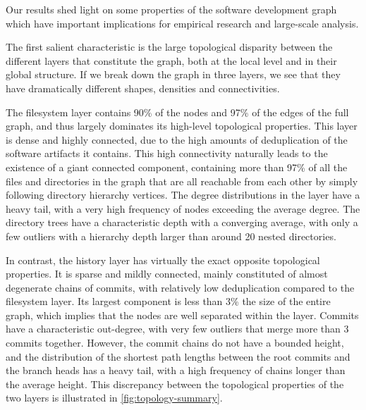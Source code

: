 Our results shed light on some properties of the software development graph
which have important implications for empirical research and large-scale
analysis.

The first salient characteristic is the large topological disparity between the
different layers that constitute the graph, both at the local level and in
their global structure. If we break down the graph in three layers, we see that
they have dramatically different shapes, densities and connectivities.

The filesystem layer contains 90\% of the nodes and 97\% of the edges of the
full graph, and thus largely dominates its high-level topological properties.
This layer is dense and highly connected, due to the high amounts of
deduplication of the software artifacts it contains. This high connectivity
naturally leads to the existence of a giant connected component, containing
more than 97\% of all the files and directories in the graph that are all
reachable from each other by simply following directory hierarchy vertices.
The degree distributions in the layer have a heavy tail, with a very high
frequency of nodes exceeding the average degree.
The directory trees have a characteristic depth with a converging average, with
only a few outliers with a hierarchy depth larger than around 20 nested
directories.

In contrast, the history layer has virtually the exact opposite topological
properties. It is sparse and mildly connected, mainly constituted of almost
degenerate chains of commits, with relatively low deduplication compared to the
filesystem layer. Its largest component is less than 3\% the size of the entire
graph, which implies that the nodes are well separated within the layer.
Commits have a characteristic out-degree, with very few outliers that merge
more than 3 commits together. However, the commit chains do not have a bounded
height, and the distribution of the shortest path lengths between the root
commits and the branch heads has a heavy tail, with a high frequency of chains
longer than the average height. This discrepancy between the topological
properties of the two layers is illustrated in \cref{fig:topology-summary}.

